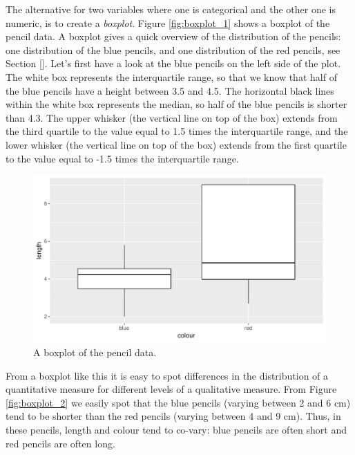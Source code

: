 \documentclass[]{book}\usepackage[]{graphicx}\usepackage[]{color}
\makeatletter
\def\maxwidth{ %
  \ifdim\Gin@nat@width>\linewidth
    \linewidth
  \else
    \Gin@nat@width
  \fi
}
\makeatother
\begin{document}
The alternative for two variables where one is categorical and the other one is numeric, is to create a \textit{boxplot}. Figure \ref{fig:boxplot_1} shows a boxplot of the pencil data. A boxplot gives a quick overview of the distribution of the pencils: one distribution of the blue pencils, and one distribution of the red pencils, see Section \ref{}. Let's first have a look at the blue pencils on the left side of the plot. The white box represents the interquartile range, so that we know that half of the blue pencils have a height between 3.5 and 4.5. The horizontal black lines within the white box represents the median, so half of the blue pencils is shorter than 4.3. The upper whisker (the vertical line on top of the box) extends from the third quartile to the value equal to 1.5 times the interquartile range, and the lower whisker (the vertical line on top of the box) extends from the first quartile to the value equal to -1.5 times the interquartile range.

\begin{figure}

{\centering \includegraphics[width=\maxwidth]{figure/crosstable_3-1} 

}

\caption[A boxplot of the pencil data]{A boxplot of the pencil data.}\label{fig:crosstable_3}
\end{figure}



From a boxplot like this it is easy to spot differences in the distribution of a quantitative measure for different levels of a qualitative measure. From Figure \ref{fig:boxplot_2} we easily spot that the blue pencils (varying between 2 and 6 cm) tend to be shorter than the red pencils (varying between 4 and 9 cm). Thus, in these pencils, length and colour tend to co-vary: blue pencils are often short and red pencils are often long.
\end{document}
